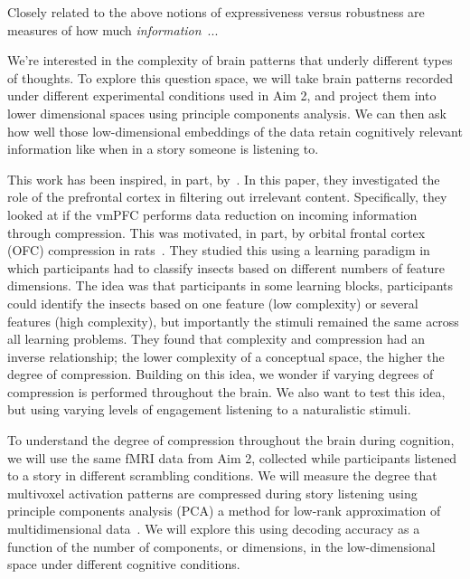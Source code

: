 \documentclass[english]{article}
\begin{document}
Closely related to the above notions of expressiveness versus robustness are
measures of how much \textit{information}~\citep{Shan48}...






We're interested in the complexity of brain patterns that underly different
types of thoughts. To explore this question space, we will take brain patterns
recorded under different experimental conditions used in Aim 2, and project
them into lower dimensional spaces using principle components analysis. We can
then ask how well those low-dimensional embeddings of the data retain
cognitively relevant information like when in a story someone is listening to.

This work has been inspired, in part, by~\cite{MackEtal20}. In this paper, they
investigated the role of the prefrontal cortex in filtering out irrelevant
content. Specifically, they looked at if the vmPFC performs data reduction on
incoming information through compression. This was motivated, in part, by
orbital frontal cortex (OFC) compression in rats~\citep{ZhouEtal19}. They
studied this using a learning paradigm in which participants had to classify
insects based on different numbers of feature dimensions. The idea was that
participants in some learning blocks, participants could identify the insects
based on one feature (low complexity) or several features (high complexity),
but importantly the stimuli remained the same across all learning problems.
They found that complexity and compression had an inverse relationship; the
lower complexity of a conceptual space, the higher the degree of compression.
Building on this idea, we wonder if varying degrees of compression is performed
throughout the brain. We also want to test this idea, but using varying levels
of engagement listening to a naturalistic stimuli.

To understand the degree of compression throughout the brain during cognition,
we will use the same fMRI data from Aim 2, collected while participants
listened to a story in different scrambling conditions. We will measure the
degree that multivoxel activation patterns are compressed during story
listening using principle components analysis (PCA) a method for low-rank
approximation of multidimensional data~\citep{EckaYoun36}. We will explore this
using decoding accuracy as a function of the number of components, or
dimensions, in the low-dimensional space under different cognitive conditions.
\end{document}
